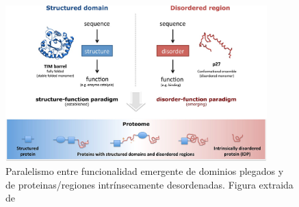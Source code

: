 \begin{figure}[h!,centered]
\centering
\includegraphics[width=0.9\textwidth]{img/structure-idp-function.jpeg} 
\caption{Paralelismo entre funcionalidad emergente de dominios plegados y de proteinas/regiones intrínsecamente desordenadas. Figura extraida de \cite{van2014classification}}
\label{stuctured-idp-functions}
\end{figure}




% 
% 
% 
% 








